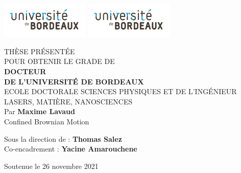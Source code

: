 \begin{titlepage}
\pagestyle{empty}
\includegraphics[scale=1, height=1.7cm]{01_head/images/brdx.pdf}
\hfill
\includegraphics[scale=1, height=1.7cm]{01_head/images/brdx.pdf}
\hfill
\begin{center}
\doublespacing
\begin{Large}

THÈSE PRÉSENTÉE\\ POUR OBTENIR LE GRADE DE \\
{\large \textbf{DOCTEUR\\DE L'UNIVERSITÉ DE BORDEAUX} } \\
\vspace{0.40cm}
ECOLE DOCTORALE SCIENCES PHYSIQUES ET DE L'INGÉNIEUR\\
{\normalsize LASERS, MATIÈRE, NANOSCIENCES} \\
\vspace{0.40cm}
Par \textbf{Maxime Lavaud} \\
\vspace{0.40cm}
{\Large Confined Brownian Motion}
\end{Large}
\vspace{0.40cm}
\begin{normalsize}
\begin{singlespace}
Sous la direction de : \textbf{Thomas Salez}\\
Co-encadrement : \textbf{Yacine Amarouchene}
\end{singlespace}
\end{normalsize}
\end{center}

{\large Soutenue le 26 novembre 2021 }\\


\end{titlepage}
